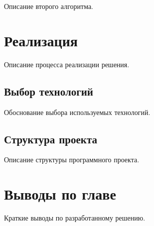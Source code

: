 Описание второго алгоритма.

\section{Реализация}

Описание процесса реализации решения.

\subsection{Выбор технологий}

Обоснование выбора используемых технологий.

\subsection{Структура проекта}

Описание структуры программного проекта.

\section{Выводы по главе}

Краткие выводы по разработанному решению.
